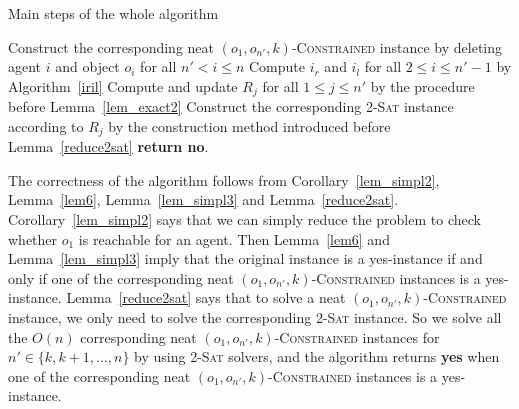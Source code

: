 \begin{algorithm}[h]
    \caption{Main steps of the whole algorithm}
    \label{alg:RO}
    {
        Construct the corresponding neat $(o_1,o_{n'},k)$-\textsc{Constrained} instance by deleting agent $i$ and object $o_i$ for all $n'<i\leq n$\;
        Compute $i_r$ and $i_l$ for all $2\leq i\leq n'-1$ by Algorithm~\ref{iril}\;
        Compute and update $R_j$ for all  $1\leq j\leq n'$ by the procedure before Lemma~\ref{lem_exact2}\;
        Construct the corresponding \textsc{2-Sat} instance according to $R_j$ by the construction method introduced before Lemma~\ref{reduce2sat}\;
    }
    \textbf{return no}.
\end{algorithm}


The correctness of the algorithm follows from Corollary~\ref{lem_simpl2}, Lemma~\ref{lem6}, Lemma~\ref{lem_simpl3} and Lemma~\ref{reduce2sat}.
Corollary~\ref{lem_simpl2} says that we can simply reduce the problem to check whether $o_1$ is reachable for an agent. Then Lemma~\ref{lem6} and Lemma~\ref{lem_simpl3}
imply that the original instance is a yes-instance if and only if one of the corresponding neat $(o_1,o_{n'},k)$-\textsc{Constrained} instances is a yes-instance.
Lemma~\ref{reduce2sat} says that to solve a neat $(o_1,o_{n'},k)$-\textsc{Constrained} instance, we only need to solve the corresponding \textsc{2-Sat} instance.
So we solve all the $O(n)$ corresponding neat $(o_1,o_{n'},k)$-\textsc{Constrained} instances for $n'\in \{k, k+1, \dots, n\}$ by using \textsc{2-Sat} solvers, and
the algorithm returns \textbf{yes}
when one of the corresponding neat $(o_1,o_{n'},k)$-\textsc{Constrained} instances is a yes-instance.


